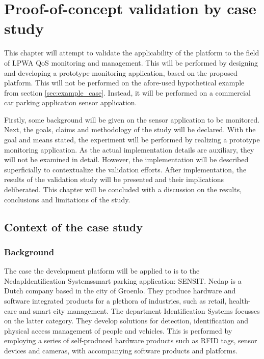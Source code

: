 \newcommand{\nedapidsystems}{\nedapidsystemsnospace\space}
\newcommand{\idsystems}{\idsystemsnospace\space}
\newcommand{\nedap}{\nedapnospace\space}
\newcommand{\ublox}{\ubloxnospace\space}
\newcommand{\sensit}{\sensitnospace\space}
\newcommand{\nedapidsystemsnospace}{\nedap\space\idsystems}
\newcommand{\idsystemsnospace}{Identification Systems}
\newcommand{\nedapnospace}{Nedap}
\newcommand{\ubloxnospace}{u-blox}
\newcommand{\sensitnospace}{SENSIT}
\chapter{Proof-of-concept validation by case study}
\label{ch:validation}
This chapter will attempt to validate the applicability of the platform to the field of LPWA QoS monitoring and management. This will be performed by designing and developing a prototype monitoring application, based on the proposed platform. This will not be performed on the afore-used hypothetical example from section \ref{sec:example_case}. Instead, it will be performed on a commercial car parking application sensor application. 

Firstly, some background will be given on the sensor application to be monitored. Next, the goals, claims and methodology of the study will be declared. With the goal and means stated, the experiment will be performed by realizing a prototype monitoring application. As the actual implementation details are auxiliary, they will not be examined in detail. However, the implementation will be described superficially to contextualize the validation efforts. After implementation, the results of the validation study will be presented and their implications deliberated. This chapter will be concluded with a discussion on the results, conclusions and limitations of the study.
\section{Context of the case study}
\subsection{Background}
\label{sec:sensit}
The case the development platform will be applied to is to the \nedapidsystems smart parking application: \sensitnospace. \nedap\cite{web:nedap} is a Dutch company based in the city of Groenlo. They produce hardware and software integrated products for a plethora of industries, such as retail, health-care and smart city management. The department \idsystems\cite{web:idsystems} focusses on the latter category. They develop solutions for detection, identification and physical access management of people and vehicles. This is performed by employing a series of self-produced hardware products such as RFID tags, sensor devices and cameras, with accompanying software products and platforms. 
